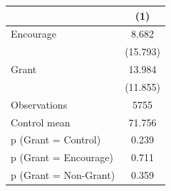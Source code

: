 \begin{tabular*}{\hsize}{@{\hskip\tabcolsep\extracolsep\fill}l*{1}{c}}
\toprule
                    &\multicolumn{1}{c}{(1)}\\
\midrule
Encourage           &       8.682\\
                    &    (15.793)\\
\addlinespace
Grant               &      13.984\\
                    &    (11.855)\\
\midrule
Observations        &        5755\\
Control mean        &      71.756\\
p (Grant = Control) &       0.239\\
p (Grant = Encourage)&       0.711\\
p (Grant = Non-Grant)&       0.359\\
\bottomrule
\end{tabular*}
